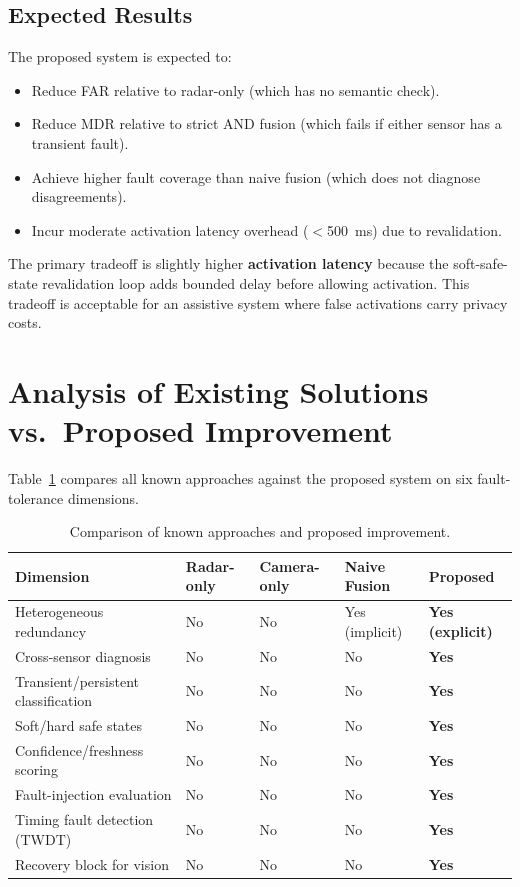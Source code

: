 \documentclass[12pt]{extarticle}
\begin{document}
\subsection{Expected Results}

The proposed system is expected to:
\begin{itemize}
  \item Reduce FAR relative to radar-only (which has no semantic check).
  \item Reduce MDR relative to strict AND fusion (which fails if either sensor has
        a transient fault).
  \item Achieve higher fault coverage than naive fusion (which does not diagnose
        disagreements).
  \item Incur moderate activation latency overhead ($<$500~ms) due to revalidation.
\end{itemize}

The primary tradeoff is slightly higher \textbf{activation latency} because the
soft-safe-state revalidation loop adds bounded delay before allowing activation.
This tradeoff is acceptable for an assistive system where false activations carry
privacy costs.

\section{Analysis of Existing Solutions vs.\ Proposed Improvement}
\label{sec:analysis}

Table~\ref{tab:comparison} compares all known approaches against the proposed system
on six fault-tolerance dimensions.

\begin{table}[H]
\centering
\caption{Comparison of known approaches and proposed improvement.}
\label{tab:comparison}
\small
\begin{tabularx}{\textwidth}{lXXXX}
\toprule
\textbf{Dimension} & \textbf{Radar-only} & \textbf{Camera-only} & \textbf{Naive Fusion} & \textbf{Proposed}\\
\midrule
Heterogeneous redundancy &
  No &
  No &
  Yes (implicit) &
  \textbf{Yes (explicit)}\\
Cross-sensor diagnosis &
  No &
  No &
  No &
  \textbf{Yes}\\
Transient/persistent classification &
  No &
  No &
  No &
  \textbf{Yes}\\
Soft/hard safe states &
  No &
  No &
  No &
  \textbf{Yes}\\
Confidence/freshness scoring &
  No &
  No &
  No &
  \textbf{Yes}\\
Fault-injection evaluation &
  No &
  No &
  No &
  \textbf{Yes}\\
Timing fault detection (TWDT) &
  No &
  No &
  No &
  \textbf{Yes}\\
Recovery block for vision &
  No &
  No &
  No &
  \textbf{Yes}\\
\bottomrule
\end{tabularx}
\end{table}
\end{document}
